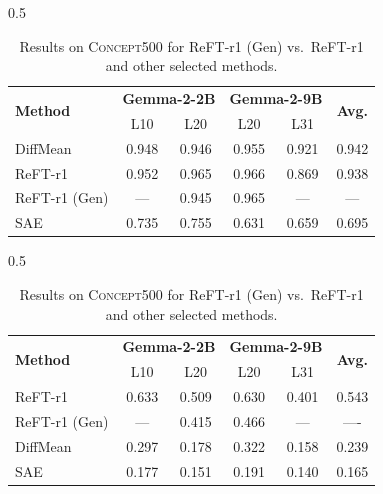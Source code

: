 \begin{table}[!ht]
\begin{subtable}[b]{0.5\textwidth}
    \small
    \centering
\begin{tabular}{lccccc}
\toprule
\multirow[t]{2}{*}{\textbf{Method}} & \multicolumn{2}{c}{\textbf{Gemma-2-2B}}  & \multicolumn{2}{c}{\textbf{Gemma-2-9B}} & \multirow[t]{2}{*}{\textbf{Avg.}} \\
& \multicolumn{1}{c}{L10} & \multicolumn{1}{c}{L20} & \multicolumn{1}{c}{L20} & \multicolumn{1}{c}{L31} \\
\midrule
DiffMean & 0.948 & 0.946 & 0.955 & 0.921 & 0.942 \\
ReFT-r1 & 0.952 & 0.965 & 0.966 & 0.869 & 0.938 \\
\rowcolor{blue!20} ReFT-r1 (Gen) & --- & 0.945 & 0.965 & --- & --- \\
SAE & 0.735 & 0.755 & 0.631 & 0.659 & 0.695 \\
\bottomrule
\end{tabular}
\caption{\concepttag{} Mean AUROC.}
\label{tab:subspace-gen-roc-auc}
\end{subtable}
\begin{subtable}[b]{0.5\textwidth}
    \small
    \centering
\begin{tabular}{lccccc}
\toprule
\multirow[t]{2}{*}{\textbf{Method}} & \multicolumn{2}{c}{\textbf{Gemma-2-2B}}  & \multicolumn{2}{c}{\textbf{Gemma-2-9B}} & \multirow[t]{2}{*}{\textbf{Avg.}} \\
& \multicolumn{1}{c}{L10} & \multicolumn{1}{c}{L20} & \multicolumn{1}{c}{L20} & \multicolumn{1}{c}{L31} \\
\midrule
ReFT-r1 & 0.633 & 0.509 & 0.630 & 0.401 & 0.543 \\
\rowcolor{blue!20}
ReFT-r1 (Gen) & --- & 0.415 & 0.466 & --- & ---- \\
DiffMean & 0.297 & 0.178 & 0.322 & 0.158 & 0.239 \\
SAE & 0.177 & 0.151 & 0.191 & 0.140 & 0.165 \\
\bottomrule
\end{tabular}
\caption{\steeringtag{} Overall score.}
\label{tab:subspace-gen-steer-judge}
\end{subtable}
    \caption{Results on \textsc{Concept500} for ReFT-r1 (Gen) vs.~ReFT-r1 and other selected methods.}
    \label{tab:subspace-gen}
\end{table}
